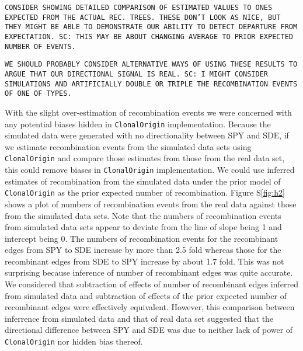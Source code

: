 \documentclass[english]{article}
\begin{document}
\texttt{CONSIDER SHOWING DETAILED COMPARISON OF ESTIMATED VALUES TO ONES 
EXPECTED FROM THE ACTUAL REC. TREES. THESE DON'T LOOK AS NICE, BUT THEY MIGHT 
BE ABLE TO DEMONSTRATE OUR ABILITY TO DETECT DEPARTURE FROM EXPECTATION. SC:
THIS MAY BE ABOUT CHANGING AVERAGE TO PRIOR EXPECTED NUMBER OF EVENTS.}

\texttt{WE SHOULD PROBABLY CONSIDER ALTERNATIVE WAYS OF USING THESE RESULTS TO 
ARGUE THAT OUR DIRECTIONAL SIGNAL IS REAL. SC: I MIGHT CONSIDER SIMULATIONS AND
ARTIFICIALLY DOUBLE OR TRIPLE THE RECOMBINATION EVENTS OF ONE OF TYPES.}

With the slight over-estimation of recombination events we were concerned with 
any potential biases hidden in \texttt{ClonalOrigin} implementation. Because the 
simulated data were generated with no directionality between SPY and SDE,  if 
we estimate recombination events from the simulated data sets using 
\texttt{ClonalOrigin} and compare those estimates from those from the real data set, 
this could remove biases in \texttt{ClonalOrigin} implementation. We could use inferred 
estimates of recombination from the simulated data under the prior model of 
\texttt{ClonalOrigin} as the prior expected number of recombination. Figure 
S\ref{fig:h2} shows a plot of numbers of recombination events from the real 
data against those from the simulated data sets. Note that the numbers of 
recombination events from simulated data sets appear to deviate from the line 
of slope being 1 and intercept being 0. The numbers of recombination events for 
the recombinant edges from SPY to SDE increase by more than 2.5 fold whereas 
those for the recombinant edges from SDE to SPY increase by about 1.7 fold.  
This was not surprising because inference of number of recombinant edges was 
quite accurate. We considered that subtraction of effects of number of 
recombinant edges inferred from simulated data and subtraction of effects of 
the prior expected number of recombinant edges were effectively equivalent. 
However, this comparison between inferrence from simulated data and that of 
real data set suggested that the directional difference between SPY and SDE was 
due to neither lack of power of \texttt{ClonalOrigin} nor hidden bias thereof.
\end{document}
